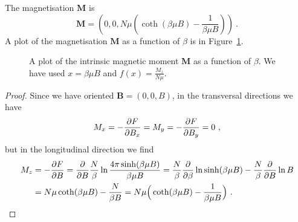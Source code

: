     The magnetisation $\mathbf M$ is 
    \begin{equation*}
        \mathbf M = (0, 0, N\mu (\coth(\beta \mu B) - \frac{1}{\beta \mu B})) ~.
    \end{equation*}
    A plot of the magnetisation $\mathbf M$ as a function of $\beta$ is in Figure~\ref{fig:c:mag}.
    \begin{figure}
        \centering
        \caption{A plot of the intrinsic magnetic moment $\mathbf M$ as a function of $\beta$. We have used $x = \beta \mu B$ and $f(x) = \frac{M_z}{N \mu}$.}
        \label{fig:c:mag}
    \end{figure}
    \begin{proof}
        Since we have oriented $\mathbf B = (0, 0, B)$, in the transversal directions we have
        \begin{equation*}
            M_x = - \frac{\partial F}{\partial B_x} = M_y = - \frac{\partial F}{\partial B_y} = 0 ~,
        \end{equation*}
        but in the longitudinal direction we find
        \begin{equation*}
        \begin{aligned}
            M_z & = - \frac{\partial F}{\partial B} = \frac{\partial}{\partial B} \frac{N}{\beta} \ln \frac{4 \pi \sinh (\beta \mu B)}{\beta \mu B} = \frac{N}{\beta} \frac{\partial}{\partial\beta} \ln \sinh (\beta \mu B) - \frac{N}{\beta} \frac{\partial}{\partial B} \ln B \\ & = N \mu \coth(\beta \mu B) - \frac{N}{\beta B} = N \mu \Big (\coth (\beta \mu B) - \frac{1}{\beta \mu B} \Big ) ~.
        \end{aligned}
        \end{equation*}
    \end{proof}
    
